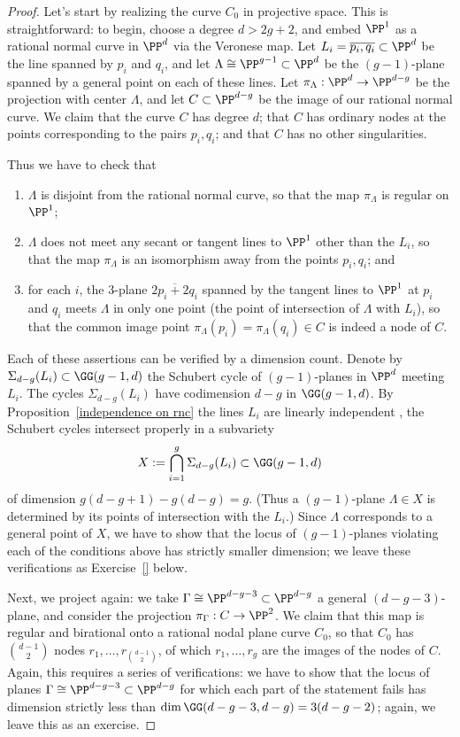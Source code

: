 \begin{proof}
Let's start by realizing the curve $C_0$ in projective space. This is straightforward: to begin, choose a degree $d > 2g+2$, and embed $\PP^1$ as a rational normal curve in $\PP^d$ via the Veronese map. Let $L_i = \overline{p_i,q_i} \subset \PP^d$ be the line spanned by $p_i$ and $q_i$, and let $\Lambda \cong \PP^{g-1} \subset \PP^d$ be the $(g-1)$-plane spanned by a general point on each of these
lines.
Let $\pi_\Lambda : \PP^d \to \PP^{d-g}$ be the projection with center $\Lambda$, and let $C \subset \PP^{d-g}$ be the image of our rational normal curve. We claim that the curve $C$ has degree $d$; that  $C$ has ordinary nodes at the points corresponding to the pairs $p_i,q_i$; and that $C$ has no other singularities.

Thus we have to check that
\begin{enumerate}
\item $\Lambda$ is disjoint from the rational normal curve, so that the map $\pi_\Lambda$ is regular on $\PP^1$;
\item $\Lambda$ does not meet any secant or tangent lines to $\PP^1$ other than the $L_i$, so that the map $\pi_\Lambda$ is an isomorphism away from the points $p_i, q_i$; and
\item for each $i$, the 3-plane $\overline{2p_i + 2q_i}$ spanned by the tangent lines to $\PP^1$ at $p_i$ and $q_i$ meets $\Lambda$ in only one point (the point of intersection of $\Lambda$ with $L_i$), so that the common image point $\pi_\Lambda(p_i) = \pi_\Lambda(q_i) \in C$ is indeed a node of $C$.
\end{enumerate}

Each of these assertions can be verified by a  dimension count. Denote by $\Sigma_{d-g}(L_i) \subset \GG(g-1, d)$ the Schubert cycle of $(g-1)$-planes in $\PP^d$ meeting $L_i$. The cycles $\Sigma_{d-g}(L_i)$ have codimension $d-g$ in $\GG(g-1,d)$. By Proposition~\ref{independence on rnc} the lines $L_i$ are linearly independent , the Schubert cycles intersect properly in a subvariety
$$
X := \bigcap_{i=1}^g \Sigma_{d-g}(L_i) \subset \GG(g-1,d)
$$
of dimension $g(d-g+1) - g(d-g) = g$. (Thus a $(g-1)$-plane $\Lambda \in X$ is determined by its points of intersection with the $L_i$.) Since $\Lambda$ corresponds to a general point of $X$, we 
 have to show that the locus of $(g-1)$-planes violating each of the conditions above has strictly smaller dimension; we leave these verifications as Exercise~\ref{} below.

Next, we project again: we take $\Gamma \cong \PP^{d-g-3} \subset \PP^{d-g}$ a general $(d-g-3)$-plane, and consider the projection $\pi_\Gamma : C \to \PP^2$. We claim that this map is regular and birational onto a rational nodal plane curve $C_0$, so that $C_0$ has $\binom{d-1}{2}$ nodes $r_1,\dots,r_{\binom{d-1}{2}}$, of which $r_1,\dots,r_g$ are the images of the nodes of $C$. Again, this requires a series of verifications: we have to show that the locus of planes $\Gamma \cong \PP^{d-g-3} \subset \PP^{d-g}$ for which each part of the statement fails has dimension strictly less than $\dim \GG(d-g-3, d-g) = 3(d-g-2)$; again, we leave this as an exercise.


\end{proof}
